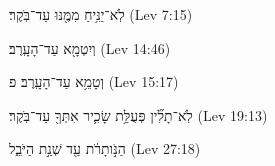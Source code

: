 
\begin{exe}

\ex\label{antdur_Lev_exs1}
\texthebrew{
לֹֽא־יַנִּ֥יחַ מִמֶּ֖נּוּ עַד־בֹּֽקֶר׃ 
} (Lev 7:15)

\ex\label{antdur_Lev_exs2}
\texthebrew{
וְיִטְמָ֖א עַד־הָעָֽרֶב׃ 
} (Lev 14:46)

\ex\label{antdur_Lev_exs3}
\texthebrew{
וְטָמֵ֥א עַד־הָעָֽרֶב׃ פ 
} (Lev 15:17)

\ex\label{antdur_Lev_exs4}
\texthebrew{
לֹֽא־תָלִ֞ין פְּעֻלַּ֥ת שָׂכִ֛יר אִתְּךָ֖ עַד־בֹּֽקֶר׃ 
} (Lev 19:13)

\ex\label{antdur_Lev_exs5}
\texthebrew{
הַנֹּ֣ותָרֹ֔ת עַ֖ד שְׁנַ֣ת הַיֹּבֵ֑ל 
} (Lev 27:18)

\end{exe}

